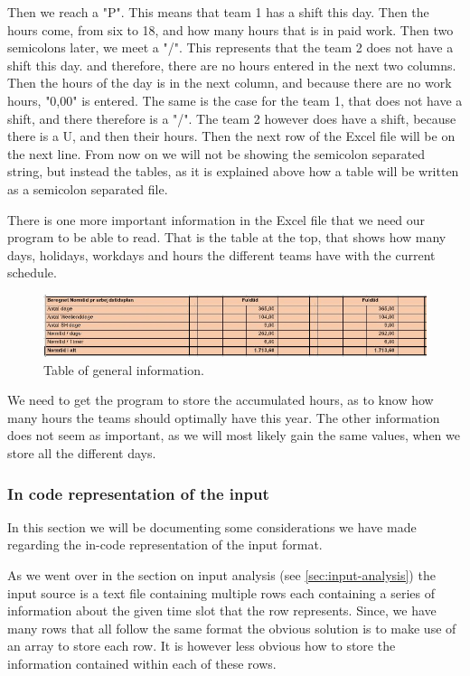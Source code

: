 Then we reach a "P". This means that \primo team 1 has a shift this day. Then the hours come, from six to 18, and how many hours that is in paid work. Then two semicolons later, we meet a "/". This represents that the \primo team 2 does not have a shift this day. and therefore, there are no hours entered in the next two columns. Then the hours of the day is in the next column, and because there are no work hours, "0,00" is entered. The same is the case for the \ultimo team 1, that does not have a shift, and there therefore is a "/". The \ultimo team 2 however does have a shift, because there is a U, and then their hours. Then the next row of the Excel file will be on the next line. From now on we will not be showing the semicolon separated string, but instead the tables, as it is explained above how a table will be written as a semicolon separated file.

There is one more important information in the Excel file that we need our program to be able to read. That is the table at the top, that shows how many days, holidays, workdays and hours the different teams have with the current schedule.
 
\begin{figure}[ht!]
    \centering
    \includegraphics[width=\textwidth]{media/Table P2.JPG}
    \caption{Table of general information.}
    \label{fig:Table_information}
\end{figure}

We need to get the program to store the accumulated hours, as to know how many hours the teams should optimally have this year. The other information does not seem as important, as we will most likely gain the same values, when we store all the different days.


\subsubsection{In code representation of the input}
In this section we will be documenting some considerations we have made regarding the in-code representation of the input format.

As we went over in the section on input analysis (see \ref{sec:input-analysis}) the input source is a text file containing multiple rows each containing a series of information about the given time slot that the row represents. Since, we have many rows that all follow the same format the obvious solution is to make use of an array to store each row. It is however less obvious how to store the information contained within each of these rows.

